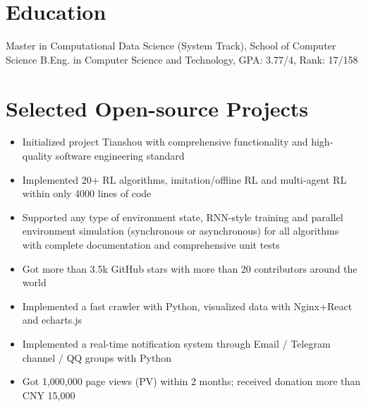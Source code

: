 \documentclass{resume}
\begin{document}



\section{Education}
Master in Computational Data Science (System Track), School of Computer Science
B.Eng. in Computer Science and Technology, GPA: 3.77/4, Rank: 17/158

\section{Selected Open-source Projects}
\begin{itemize}
  \item Initialized project Tianshou with comprehensive functionality and high-quality software engineering standard
  \item Implemented 20+ RL algorithms, imitation/offline RL and multi-agent RL within only 4000 lines of code
  \item Supported any type of environment state, RNN-style training and parallel environment simulation (synchronous or asynchronous) for all algorithms with complete documentation and comprehensive unit tests
  \item Got more than 3.5k GitHub stars with more than 20 contributors around the world
\end{itemize}

\begin{itemize}
  \item Implemented a fast crawler with Python, visualized data with Nginx+React and echarts.js
  \item Implemented a real-time notification system through Email / Telegram channel / QQ groups with Python
  \item Got 1,000,000 page views (PV) within 2 months; received donation more than CNY 15,000
\end{itemize}
\end{document}
